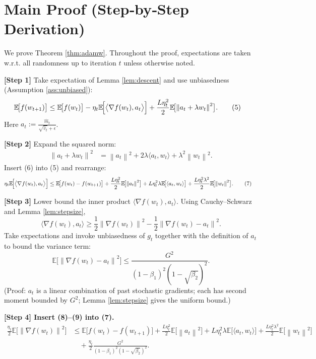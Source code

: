 \documentclass{article}
\newcommand{\EE}{\mathbb{E}}
\newcommand{\norm}[1]{\left\|#1\right\|}
\begin{document}
\section*{Main Proof (Step‑by‑Step Derivation)}
We prove Theorem \ref{thm:adamw}. Throughout the proof, expectations are taken w.r.t. all randomness up to iteration $t$ unless otherwise noted.

\medskip
\noindent\textbf{[Step 1]} Take expectation of Lemma \ref{lem:descent} and use unbiasedness (Assumption \ref{ass:unbiased}):
\begin{align}
    \EE\!\bigl[f(w_{t+1})\bigr]
    &\le \EE\!\bigl[f(w_t)\bigr]
       -\eta_t\EE\!\Bigl[\bigl\langle\nabla f(w_t),a_t\bigr\rangle\Bigr]
       +\frac{L\eta_t^{2}}{2}\EE\!\bigl[\norm{a_t+\lambda w_t}^{2}\bigr]. \tag{5}
\end{align}
Here $a_t:=\frac{\hat m_t}{\sqrt{\hat v_t}+\epsilon}$.

\medskip
\noindent\textbf{[Step 2]} Expand the squared norm:
\begin{align}
    \norm{a_t+\lambda w_t}^{2}
    &=\norm{a_t}^{2}+2\lambda\langle a_t,w_t\rangle+\lambda^{2}\norm{w_t}^{2}. \tag{6}
\end{align}
Insert (6) into (5) and rearrange:
\begin{align}
    \eta_t\EE\!\Bigl[\bigl\langle\nabla f(w_t),a_t\bigr\rangle\Bigr]
    &\le \EE\!\bigl[f(w_t)-f(w_{t+1})\bigr]
      +\frac{L\eta_t^{2}}{2}\EE\!\bigl[\norm{a_t}^{2}\bigr]
      +L\eta_t^{2}\lambda\EE\!\bigl[\langle a_t,w_t\rangle\bigr]
      +\frac{L\eta_t^{2}\lambda^{2}}{2}\EE\!\bigl[\norm{w_t}^{2}\bigr]. \tag{7}
\end{align}

\medskip
\noindent\textbf{[Step 3]} Lower bound the inner product $\langle\nabla f(w_t),a_t\rangle$.
Using Cauchy–Schwarz and Lemma \ref{lem:stepsize},
\[
    \langle\nabla f(w_t),a_t\rangle
    \ge \frac{1}{2}\norm{\nabla f(w_t)}^{2}
        -\frac{1}{2}\norm{\nabla f(w_t)-a_t}^{2}. \tag{8}
\]
Take expectations and invoke unbiasedness of $g_t$ together with the definition of $a_t$ to bound the variance term:
\[
    \EE\!\bigl[\norm{\nabla f(w_t)-a_t}^{2}\bigr]
    \le \frac{G^{2}}{(1-\beta_1)^{2}(1-\sqrt{\beta_2})^{2}}. \tag{9}
\]
(Proof: $a_t$ is a linear combination of past stochastic gradients; each has second moment bounded by $G^{2}$; Lemma \ref{lem:stepsize} gives the uniform bound.)

\medskip
\noindent\textbf{[Step 4] Insert (8)–(9) into (7).}
\begin{align}
    \frac{\eta_t}{2}\EE\!\bigl[\norm{\nabla f(w_t)}^{2}\bigr]
    &\le \EE\!\bigl[f(w_t)-f(w_{t+1})\bigr]
      +\frac{L\eta_t^{2}}{2}\EE\!\bigl[\norm{a_t}^{2}\bigr]
      +L\eta_t^{2}\lambda\EE\!\bigl[\langle a_t,w_t\rangle\bigr]
      +\frac{L\eta_t^{2}\lambda^{2}}{2}\EE\!\bigl[\norm{w_t}^{2}\bigr]   \nonumber\\
    &\quad +\frac{\eta_t}{2}\frac{G^{2}}{(1-\beta_1)^{2}(1-\sqrt{\beta_2})^{2}}. \tag{10}
\end{align}
\end{document}
